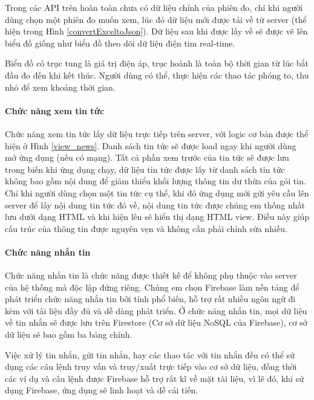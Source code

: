 Trong các API trên hoàn toàn chưa có dữ liệu chính của phiên đo, chỉ khi người dùng chọn một phiên đo muốn xem, lúc đó dữ liệu
mới được tải về từ server (thể hiện trong Hình \ref{convertExceltoJson}). Dữ liệu sau khi được lấy về sẽ được vẽ lên biểu đồ giống
như biểu đồ theo dõi dữ liệu điện tim real-time.

Biểu đồ có trục tung là giá trị điện áp, trục hoành là toàn bộ thời gian từ lúc bắt đầu đo đến khi kết thúc. Người dùng có thể,
thực hiện các thao tác phóng to, thu nhỏ để xem khoảng thời gian.

\paragraph{Chức năng xem tin tức}
\mbox{}

Chức năng xem tin tức lấy dữ liệu trực tiếp trên server, với logic cơ bản được thể hiện ở Hình \ref{view_news}. 
Danh sách tin tức sẽ được load ngay khi người dùng mở ứng dụng (nếu có mạng). Tất cả phần xem trước của tin tức sẽ được lưu
trong biến khi ứng dụng chạy, dữ liệu tin tức được lấy từ danh sách tin tức không bao gồm nội dung để giảm thiểu khối lượng
thông tin dư thừa của gói tin. Chỉ khi người dùng chọn một tin tức cụ thể, khi đó ứng dụng mới gửi yêu cầu lên server để lấy
nội dung tin tức đó về, nội dung tin tức được chúng em thống nhất lưu dưới dạng HTML và khi hiện lên sẽ hiển thị dạng HTML view.
Điều này giúp cấu trúc của thông tin được nguyên vẹn và không cần phải chỉnh sửa nhiều.


\paragraph{Chức năng nhắn tin}
\mbox{}

Chức năng nhắn tin là chức năng được thiết kế để không phụ thuộc vào server của hệ thống mà độc lập đứng riêng. Chúng em
chọn Firebase làm nền tảng để phát triển chức năng nhắn tin bởi tính phổ biến, hỗ trợ rất nhiều ngôn ngữ đi kèm với tài liệu đầy đủ 
và dễ dàng phát triển.
Ở chức năng nhắn tin, mọi dữ liệu về tin nhắn sẽ được lưu trên Firestore (Cơ sở dữ liệu NoSQL của Firebase), cơ sở dữ liệu sẽ
bao gồm ba bảng chính. 

Việc xử lý tin nhắn, gửi tin nhắn, hay các thao tác với tin nhắn đều có thể sử dụng các câu lệnh truy vấn và truy/xuất
trực tiếp vào cơ sở dữ liệu, đồng thời các ví dụ và câu lệnh được Firebase hỗ trợ rất kĩ về mặt tài liệu, vì lẽ đó, khi sử dụng
Firebase, ứng dụng sẽ linh hoạt và dễ cải tiến.

